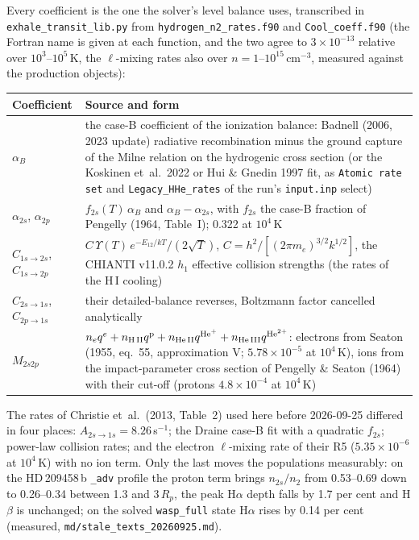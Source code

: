 \documentclass[english,a4paper]{my_memo}
\begin{document}
Every coefficient is the one the solver's level balance uses, transcribed
in \texttt{exhale\_transit\_lib.py} from \texttt{hydrogen\_n2\_rates.f90}
and \texttt{Cool\_coeff.f90} (the Fortran name is given at each function,
and the two agree to $3\times10^{-13}$ relative over $10^{3}$--$10^{5}$\,K,
the $\ell$-mixing rates also over $n = 1$--$10^{15}$\,cm$^{-3}$, measured
against the production objects):

\begin{center}
\small
\begin{tabular}{p{}p{}}
\toprule
Coefficient & Source and form \\
\midrule
$\alpha_B$ & the case-B coefficient of the ionization balance: Badnell
  (2006, 2023 update) radiative recombination minus the ground capture of
  the Milne relation on the hydrogenic cross section (or the Koskinen
  et~al.\ 2022 or Hui \& Gnedin 1997 fit, as \texttt{Atomic rate set} and
  \texttt{Legacy\_HHe\_rates} of the run's \texttt{input.inp} select) \\
$\alpha_{2s}$, $\alpha_{2p}$ & $f_{2s}(T)\,\alpha_B$ and
  $\alpha_B-\alpha_{2s}$, with $f_{2s}$ the case-B fraction of Pengelly
  (1964, Table~I); 0.322 at $10^4$\,K \\
$C_{1s\to2s}$, $C_{1s\to2p}$ & $C\,\Upsilon(T)\,e^{-E_{12}/kT}/(2\sqrt T)$,
  $C = h^2/[(2\pi m_e)^{3/2}k^{1/2}]$, the CHIANTI v11.0.2 $h_1$ effective
  collision strengths (the rates of the H\,I cooling) \\
$C_{2s\to1s}$, $C_{2p\to1s}$ & their detailed-balance reverses,
  Boltzmann factor cancelled analytically \\
$M_{2s2p}$ & $n_e q^e + n_{\rm H\,II}q^{\rm p} + n_{\rm He\,II}q^{\rm He^+}
  + n_{\rm He\,III}q^{\rm He^{2+}}$: electrons from Seaton (1955, eq.~55,
  approximation V; $5.78\times10^{-5}$ at $10^4$\,K), ions from the
  impact-parameter cross section of Pengelly \& Seaton (1964) with their
  cut-off (protons $4.8\times10^{-4}$ at $10^4$\,K) \\
\bottomrule
\end{tabular}
\end{center}

The rates of Christie et~al.\ (2013, Table~2) used here before
2026-09-25 differed in four places: $A_{2s\to1s}=8.26$\,s$^{-1}$; the
Draine case-B fit with a quadratic $f_{2s}$; power-law collision rates;
and the electron $\ell$-mixing rate of their R5 ($5.35\times10^{-6}$ at
$10^4$\,K) with no ion term. Only the last moves the populations
measurably: on the HD\,209458\,b \texttt{\_adv} profile the proton term
brings $n_{2s}/n_2$ from 0.53--0.69 down to 0.26--0.34 between 1.3 and
3\,$R_p$, the peak H$\alpha$ depth falls by 1.7 per cent and H$\beta$ is
unchanged; on the solved \texttt{wasp\_full} state H$\alpha$ rises by 0.14
per cent (measured, \texttt{md/stale\_texts\_20260925.md}).
\end{document}
